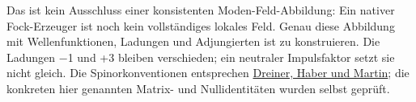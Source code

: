 Das ist kein Ausschluss einer konsistenten Moden-Feld-Abbildung: Ein
nativer Fock-Erzeuger ist noch kein vollständiges lokales Feld. Genau
diese Abbildung mit Wellenfunktionen, Ladungen und Adjungierten ist zu
konstruieren. Die Ladungen −1 und +3 bleiben verschieden; ein neutraler
Impulsfaktor setzt sie nicht gleich. Die Spinorkonventionen entsprechen
\href{https://arxiv.org/abs/0812.1594}{Dreiner, Haber und Martin}; die
konkreten hier genannten Matrix- und Nullidentitäten wurden selbst
geprüft.

